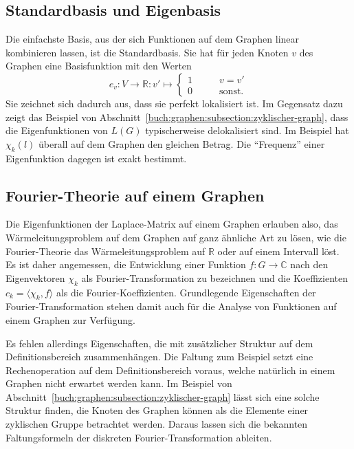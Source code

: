 \subsection{Standardbasis und Eigenbasis
\label{buch:subsection:standardbasis-und-eigenbasis}}
Die einfachste Basis, aus der sich Funktionen auf dem Graphen linear
kombinieren lassen, ist die Standardbasis.
Sie hat für jeden Knoten $v$ des Graphen eine Basisfunktion mit den Werten
\[
e_v\colon V\to\mathbb R:v'\mapsto \begin{cases}
1\qquad&v=v'\\
0\qquad&\text{sonst.}
\end{cases}
\]
Sie zeichnet sich dadurch aus, dass sie perfekt lokalisiert ist.
Im Gegensatz dazu zeigt das Beispiel von
Abschnitt~\ref{buch:graphen:subsection:zyklischer-graph}, dass
die Eigenfunktionen von $L(G)$ typischerweise delokalisiert sind.
Im Beispiel hat $\chi_k(l)$ überall auf dem Graphen den gleichen
Betrag.
Die ``Frequenz'' einer Eigenfunktion dagegen ist exakt bestimmt.

\subsection{Fourier-Theorie auf einem Graphen}
Die Eigenfunktionen der Laplace-Matrix auf einem Graphen erlauben
also, das Wärmeleitungsproblem auf dem Graphen auf ganz ähnliche
Art zu lösen, wie die Fourier-Theorie das Wärmeleitungsproblem auf
$\mathbb{R}$ oder auf einem Intervall löst.
Es ist daher angemessen, die Entwicklung einer Funktion
$f\colon G\to\mathbb{C}$ nach den Eigenvektoren $\chi_k$
als Fourier-Transformation zu bezeichnen und die Koeffizienten
\(
c_k = \langle \chi_k, f\rangle
\)
als die Fourier-Koeffizienten.
Grundlegende Eigenschaften der Fourier-Transformation stehen damit
auch für die Analyse von Funktionen auf einem Graphen zur Verfügung.

Es fehlen allerdings Eigenschaften, die mit zusätzlicher Struktur
auf dem Definitionsbereich zusammenhängen.
Die Faltung zum Beispiel setzt eine Rechenoperation auf dem
Definitionsbereich voraus, welche natürlich in einem Graphen nicht erwartet
werden kann.
Im Beispiel von Abschnitt~\ref{buch:graphen:subsection:zyklischer-graph}
lässt sich eine solche Struktur finden, die Knoten des Graphen können
als die Elemente einer zyklischen Gruppe betrachtet werden.
Daraus lassen sich die bekannten Faltungsformeln der diskreten
Fourier-Transformation ableiten.

